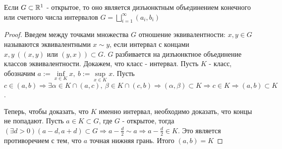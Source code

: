 \newpage
\begin{theorem}
    Если $G \subset \R^1$ - открытое, то оно является дизъюнктным объединением конечного или счетного числа интервалов $G=\bigsqcup\limits_{i=1}^{\infty}(a_i, b_i)$
\end{theorem}
\begin{proof}
Введем между точками множества $G$ отношение эквивалентности: $x, y\in G$ называются эквивалентными $x\sim y$, если интервал с концами $x, y\ ((x, y)\text{ или }(y,x)) \subset G$. $G$ разбивается на дизъюнктное объединение классов эквивалентности. Докажем, что класс - интервал. Пусть $K$ - класс, обозначим ${a:=\inf\limits_{x \in K}x,\ b:=\sup\limits_{x\in K}x}$. Пусть $c \in (a,b) \Rightarrow {\exists \alpha \in K \cap (a, c),\ \beta \in K \cap (c, b) \Rightarrow  (\alpha, \beta)\subset K  \Rightarrow c \in K} \Rightarrow (a,b) \subset K$.

Теперь, чтобы доказать, что $K$ именно интервал, необходимо доказать, что концы не попадают. Пусть $a \in K \subset G$, где $G$ - открытое, тогда $(\exists d >0)(a-d, a+d)\subset G \Rightarrow {a-\frac{d}{2} \sim a} \Rightarrow a-\frac{d}{2} \in K$. Это является противоречием с тем, что $a$ точная нижняя грань. Итого $(a, b)=K$
\end{proof}


